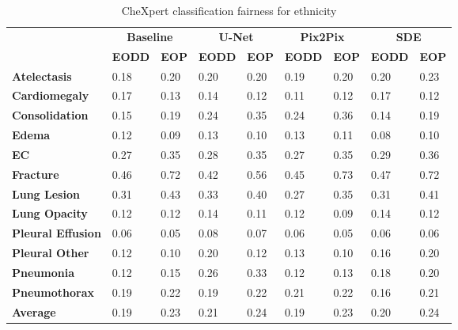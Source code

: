     
    \begin{table}[]
        \centering
        \caption{CheXpert classification fairness for ethnicity}\label{tab:chex_ethnicity}
        \begin{tabular}{l|llllllll}
        \hline
        \multirow{2}{*}{\textbf{}} & \multicolumn{2}{c|}{\textbf{Baseline}}                   & \multicolumn{2}{c|}{\textbf{U-Net}}                              & \multicolumn{2}{c|}{\textbf{Pix2Pix}}                              & \multicolumn{2}{c}{\textbf{SDE}}    \\ \cline{2-9}
                                                                                           & \textbf{EODD} & \textbf{EOP}  & \textbf{EODD} & \textbf{EOP}  & \textbf{EODD} & \textbf{EOP} & \textbf{EODD} & \textbf{EOP} \\ \hline
        \textbf{Atelectasis}  & 0.18 & 0.20 & 0.20 & 0.20 & 0.19 & 0.20 & 0.20 & 0.23 \\        
        \textbf{Cardiomegaly} & 0.17 & 0.13 & 0.14 & 0.12 & 0.11 & 0.12 & 0.17 & 0.12 \\
        \textbf{Consolidation} & 0.15 & 0.19 & 0.24 & 0.35 & 0.24 & 0.36 & 0.14 & 0.19 \\
        \textbf{Edema} & 0.12 & 0.09 & 0.13 & 0.10 & 0.13 & 0.11 & 0.08 & 0.10 \\
        \textbf{EC} & 0.27 & 0.35 & 0.28 & 0.35 & 0.27 & 0.35 & 0.29 & 0.36 \\
        \textbf{Fracture} & 0.46 & 0.72 & 0.42 & 0.56 & 0.45 & 0.73 & 0.47 & 0.72 \\
        \textbf{Lung Lesion} & 0.31 & 0.43 & 0.33 & 0.40 & 0.27 & 0.35 & 0.31 & 0.41 \\
        \textbf{Lung Opacity} & 0.12 & 0.12 & 0.14 & 0.11 & 0.12 & 0.09 & 0.14 & 0.12 \\
        \textbf{Pleural Effusion} & 0.06 & 0.05 & 0.08 & 0.07 & 0.06 & 0.05 & 0.06 & 0.06 \\
        \textbf{Pleural Other} & 0.12 & 0.10 & 0.20 & 0.12 & 0.13 & 0.10 & 0.16 & 0.20 \\
        \textbf{Pneumonia} & 0.12 & 0.15 & 0.26 & 0.33 & 0.12 & 0.13 & 0.18 & 0.20 \\
        \textbf{Pneumothorax} & 0.19 & 0.22 & 0.19 & 0.22 & 0.21 & 0.22 & 0.16 & 0.21 \\
        \textbf{Average} & 0.19 & 0.23 & 0.21 & 0.24 & 0.19 & 0.23 & 0.20 & 0.24 \\ \hline
        \end{tabular}
        \end{table}